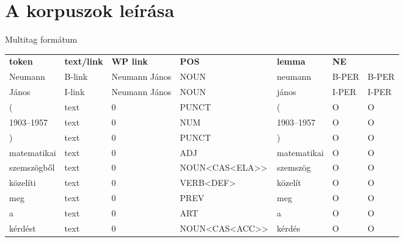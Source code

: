 \documentclass[utf8x,t]{beamer}
\begin{document}
\section{A korpuszok leírása}

\begin{frame}{Multitag formátum}

\begin{tabular}{lllllll}
\textbf{token} & \textbf{text/link} & \textbf{WP link} & \textbf{POS} & \textbf{lemma} & \textbf{NE} \\
Neumann & B-link & Neumann János & NOUN & neumann & B-PER & B-PER \\
János & I-link & Neumann János & NOUN & jános & I-PER & I-PER \\
( & text & 0 & PUNCT & ( & O & O \\
1903–1957 & text & 0 & NUM & 1903–1957 & O & O \\
) & text & 0 & PUNCT & ) & O & O \\
matematikai & text & 0 & ADJ & matematikai & O & O \\
szemszögből & text & 0 & NOUN<CAS<ELA>> & szemszög & O & O \\
közelíti & text & 0 & VERB<DEF> & közelít & O & O \\
meg & text & 0 & PREV & meg & O & O \\
a & text & 0 & ART & a & O & O \\
kérdést & text & 0 & NOUN<CAS<ACC>> & kérdés & O & O \\
\end{tabular}


\end{frame}
\end{document}
